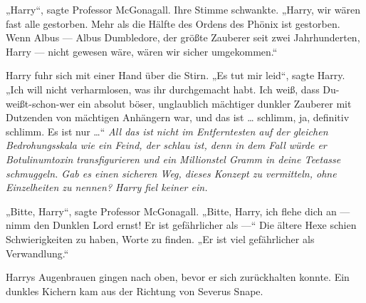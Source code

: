 „Harry“, sagte Professor McGonagall. Ihre Stimme schwankte.
„Harry, wir wären fast alle gestorben. Mehr als die Hälfte des Ordens des Phönix ist gestorben. Wenn Albus — Albus Dumbledore, der größte Zauberer seit zwei Jahrhunderten, Harry — nicht gewesen wäre, wären wir sicher umgekommen.“

Harry fuhr sich mit einer Hand über die Stirn.
„Es tut mir leid“, sagte Harry.
„Ich will nicht verharmlosen, was ihr durchgemacht habt. Ich weiß, dass Du-weißt-schon-wer ein absolut böser, unglaublich mächtiger dunkler Zauberer mit Dutzenden von mächtigen Anhängern war, und das ist … schlimm, ja, definitiv schlimm. Es ist nur …“ \emph{All das ist nicht im Entferntesten auf der gleichen Bedrohungsskala wie ein Feind, der schlau ist, denn in dem Fall würde er Botulinumtoxin transfigurieren und ein Millionstel Gramm in deine Teetasse schmuggeln. Gab es einen sicheren Weg, dieses Konzept zu vermitteln, ohne Einzelheiten zu nennen? Harry fiel keiner ein.}

„Bitte, Harry“, sagte Professor McGonagall.
„Bitte, Harry, ich flehe dich an — nimm den Dunklen Lord ernst! Er ist gefährlicher als —“ Die ältere Hexe schien Schwierigkeiten zu haben, Worte zu finden.
„Er ist viel gefährlicher als Verwandlung.“

Harrys Augenbrauen gingen nach oben, bevor er sich zurückhalten konnte. Ein dunkles Kichern kam aus der Richtung von Severus Snape.

